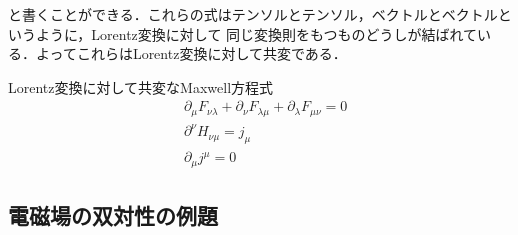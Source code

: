 \documentclass{report}
\begin{document}
    と書くことができる．これらの式はテンソルとテンソル，ベクトルとベクトルというように，Lorentz変換に対して
    同じ変換則をもつものどうしが結ばれている．よってこれらはLorentz変換に対して共変である．
    \begin{itembox}[l]{Lorentz変換に対して共変なMaxwell方程式}
      \begin{align}
        &\partial_{\mu} F_{\nu\lambda} + \partial_{\nu} F_{\lambda\mu} + \partial_{\lambda} F_{\mu\nu} = 0\\
        &\partial^{\nu}H_{\nu\mu} = j_\mu\\
        &\partial_{\mu} j^\mu = 0
      \end{align}
    \end{itembox}
  \subsection{電磁場の双対性の例題}
\end{document}
